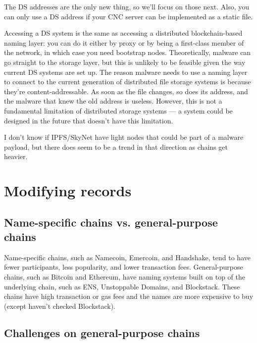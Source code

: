 \documentclass[10pt,sigconf,letterpaper]{acmart}
\begin{document}
The DS addresses are the only new thing, so we'll 
focus on those next. Also, you can only use a DS address if 
your CNC server can be implemented as a static file.

Accessing a DS system is the same as accessing a distributed 
blockchain-based naming layer: you can do it either by proxy 
or by being a first-class member of the network, in which 
case you need bootstrap nodes. Theoretically, malware can go 
straight to the storage layer, but this is unlikely to be 
feasible given the way current DS systems are set up. The 
reason malware needs 
to use a naming layer to connect to the current generation of 
distributed file storage systems is because they're 
content-addressable. As soon as the file changes, so 
does its address, and the malware that knew the old address 
is useless. 
However, this is not a fundamental limitation of distributed 
storage systems --- a system could be designed in the future 
that doesn't have this limitation.

I don't know if IPFS/SkyNet have light nodes that could be 
part of a malware payload, but there does seem to be a trend 
in that direction as chains get heavier.

\section{Modifying records}

\subsection{Name-specific chains vs. general-purpose chains}

Name-specific chains, such as Namecoin, Emercoin, and 
Handshake, tend to have fewer participants, less popularity, 
and lower transaction fees. General-purpose chains, such as 
Bitcoin and Ethereum, have naming systems built on top of the 
underlying chain, such as ENS, Unstoppable Domains, and 
Blockstack. These chains have high transaction or gas fees 
and the names are more expensive to buy (except haven't 
checked Blockstack). 

\subsection{Challenges on general-purpose chains}
\end{document}
